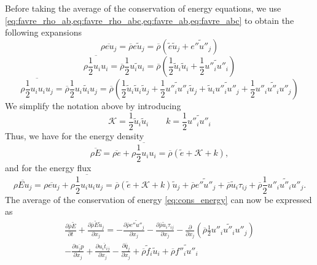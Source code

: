 \documentclass[oneside,a4paper,11pt]{report}
\newcommand{\rhoavg}{\overline{\rho}}
\newcommand{\qavg}{\overline{q}}
\newcommand{\rs}{\tau}          %
\newcommand{\eavgf}{\widetilde{e}}
\newcommand{\favgf}{\widetilde{f}}
\newcommand{\uavgf}{\widetilde{u}}
\newcommand{\Eavgf}{\widetilde{E}}
\newcommand{\eflucf}{e''}
\newcommand{\fflucf}{f''}
\newcommand{\uflucf}{u''}
\begin{document}
Before taking the average of the conservation of energy equations, we use \cref{eq:favre_rho_ab,eq:favre_rho_abc,eq:favre_ab,eq:favre_abc} to obtain the following expansions
\begin{equation}
\label{eq:intener_flux_exansion}
    \overline{ \rho e u_j } = \rhoavg \widetilde{e u_j} = \rhoavg \left ( \eavgf \uavgf_j + \widetilde{\eflucf \uflucf_j} \right)
\end{equation}
\begin{equation}
\label{eq:tke_expansion}
    \overline{ \rho \frac{1}{2} u_i u_i } = \rhoavg \frac{1}{2} \widetilde{u_i u_i} = \rhoavg \left ( \frac{1}{2} \uavgf_i \uavgf_i +  \frac{1}{2} \widetilde{\uflucf_i \uflucf_i} \right)
\end{equation}
\begin{equation}
\label{eq:tke_flux_expansion}
    \overline{ \rho \frac{1}{2} u_i u_i u_j } = \rhoavg \frac{1}{2} \widetilde{u_i u_i u_j} = \rhoavg \left ( \frac{1}{2} \uavgf_i \uavgf_i \uavgf_j + \frac{1}{2} \widetilde{\uflucf_i \uflucf_i} \uavgf_j + \uavgf_i \widetilde{\uflucf_i \uflucf_j} +  \frac{1}{2} \widetilde{\uflucf_i \uflucf_i \uflucf_j} \right)
\end{equation}
We simplify the notation above by introducing
\begin{equation}
    \mathcal{K} = \frac{1}{2} \uavgf_i \uavgf_i \qquad k = \frac{1}{2} \widetilde{\uflucf_i \uflucf_i}
\end{equation}
Thus, we have for the energy density
\begin{equation}
    \overline{ \rho E } = \overline{ \rho e } + \overline{ \rho \frac{1}{2} u_i u_i } = \rhoavg \left ( \eavgf +  \mathcal{K} + k \right ),
\end{equation}
and for the energy flux
\begin{equation}
    \overline{ \rho E u_j } = \overline{ \rho e u_j } + \overline{ \rho \frac{1}{2} u_i u_i u_j } = \rhoavg \left(\eavgf + \mathcal{K} + k \right) \uavgf_j + \rhoavg \widetilde{\eflucf \uflucf_j} + \rhoavg \uavgf_i \rs_{ij} + \rhoavg \frac{1}{2} \widetilde{\uflucf_i \uflucf_i \uflucf_j} .
\end{equation}
The average of the conservation of energy \cref{eq:cons_energy} can now be expressed as
\begin{multline}
\label{eq:favre_energy_intermediate}
\frac{\partial \rhoavg \Eavgf}{\partial t} + \frac{\partial \rhoavg \Eavgf \uavgf_j }{\partial x_j} = -\frac{\partial \rhoavg \widetilde{ \eflucf u''_j } }{\partial x_j} - \frac{\partial \rhoavg \uavgf_i \rs_{ij} }{\partial x_j} - \frac{ \partial }{ \partial x_j } \left ( \rhoavg \frac{1}{2} \widetilde{ \uflucf_i \uflucf_i \uflucf_j } \right ) \\
- \frac{ \partial \overline{ u_j p } }{\partial x_j} + \frac{ \partial \overline{ u_i t_{ij} } }{\partial x_j} - \frac{\partial \qavg_j }{\partial x_j} + \rhoavg \favgf_i \uavgf_i + \rhoavg \widetilde{ \fflucf_i \uflucf_i }
\end{multline}
\end{document}
